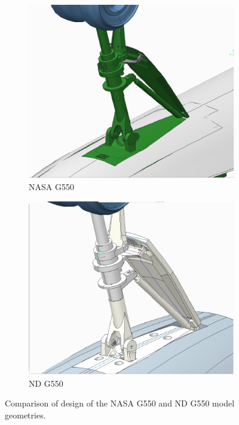 \begin{figure}
\begin{center}
\begin{subfigure}{0.45\textwidth}
\includegraphics[width=\linewidth]{figures/nasag550}
\caption{NASA G550}
\label{fig:nasag550}
\end{subfigure}
\hspace*{\fill} %
\begin{subfigure}{0.45\textwidth}
\includegraphics[width=\linewidth]{figures/ndg550}
\caption{ND G550}
\label{fig:ndg550}
\end{subfigure}
\caption{Comparison of design of the NASA G550 and ND G550 model geometries.}
\label{fig:cad}
\end{center}
\end{figure}

